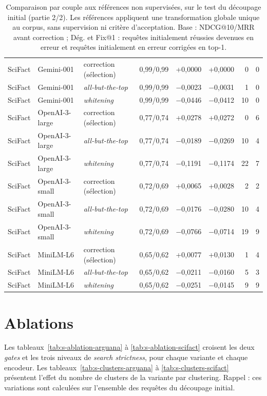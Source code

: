 \documentclass[a4paper,10pt]{article}
\begin{document}
\begin{table}[p]
\begin{tabular}{lllcrrrr}
SciFact & Gemini-001 & correction (sélection) & 0,99/0,99 & +0,0000 & +0,0000 & 0 & 0 \\
SciFact & Gemini-001 & \textit{all-but-the-top} & 0,99/0,99 & $-$0,0023 & $-$0,0031 & 1 & 0 \\
SciFact & Gemini-001 & \textit{whitening} & 0,99/0,99 & $-$0,0446 & $-$0,0412 & 10 & 0 \\
SciFact & OpenAI-3-large & correction (sélection) & 0,77/0,74 & +0,0278 & +0,0272 & 0 & 6 \\
SciFact & OpenAI-3-large & \textit{all-but-the-top} & 0,77/0,74 & $-$0,0189 & $-$0,0269 & 10 & 4 \\
SciFact & OpenAI-3-large & \textit{whitening} & 0,77/0,74 & $-$0,1191 & $-$0,1174 & 22 & 7 \\
SciFact & OpenAI-3-small & correction (sélection) & 0,72/0,69 & +0,0065 & +0,0028 & 2 & 2 \\
SciFact & OpenAI-3-small & \textit{all-but-the-top} & 0,72/0,69 & $-$0,0176 & $-$0,0280 & 10 & 4 \\
SciFact & OpenAI-3-small & \textit{whitening} & 0,72/0,69 & $-$0,0766 & $-$0,0714 & 19 & 9 \\
SciFact & MiniLM-L6 & correction (sélection) & 0,65/0,62 & +0,0077 & +0,0130 & 1 & 4 \\
SciFact & MiniLM-L6 & \textit{all-but-the-top} & 0,65/0,62 & $-$0,0211 & $-$0,0160 & 5 & 3 \\
SciFact & MiniLM-L6 & \textit{whitening} & 0,65/0,62 & $-$0,0251 & $-$0,0145 & 9 & 9 \\
\bottomrule
\end{tabular}
\caption{Comparaison par couple aux références non supervisées, sur le test du découpage initial (partie 2/2). Les références appliquent une transformation globale unique au corpus, sans supervision ni critère d'acceptation. Base : NDCG@10/MRR avant correction ; Dég. et Fix@1 : requêtes initialement réussies devenues en erreur et requêtes initialement en erreur corrigées en top-1.}
\label{tab:s-references-couples-2}
\end{table}


\section{Ablations}

Les tableaux~\ref{tab:s-ablation-arguana} à \ref{tab:s-ablation-scifact} croisent les deux \textit{gates} et les trois niveaux de \textit{search strictness}, pour chaque variante et chaque encodeur. Les tableaux~\ref{tab:s-clusters-arguana} à \ref{tab:s-clusters-scifact} présentent l'effet du nombre de clusters de la variante par clustering. Rappel : ces variations sont calculées sur l'ensemble des requêtes du découpage initial.
\end{document}
